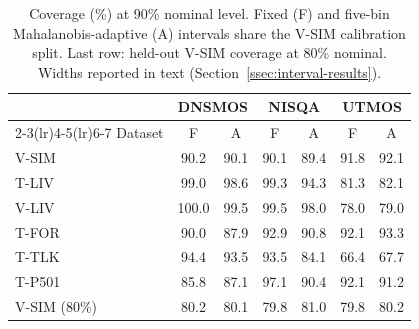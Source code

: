 \begin{table}[t]
  \centering
  \small
  \setlength{\tabcolsep}{4pt}
  \renewcommand{\arraystretch}{0.94}
  \caption{Coverage (\%) at 90\% nominal level. Fixed (F) and five-bin Mahalanobis-adaptive (A) intervals share the V-SIM calibration split. Last row: held-out V-SIM coverage at 80\% nominal. Widths reported in text (Section~\ref{ssec:interval-results}).}
  \vspace{2pt}
  \label{tab:coverage}
  \begin{tabular}{@{}lcccccc@{}}
    \toprule
    & \multicolumn{2}{c}{DNSMOS} & \multicolumn{2}{c}{NISQA} & \multicolumn{2}{c}{UTMOS} \\
    \cmidrule(lr){2-3}\cmidrule(lr){4-5}\cmidrule(lr){6-7}
    Dataset & F & A & F & A & F & A \\
    \midrule
    V-SIM  & 90.2  & 90.1 & 90.1 & 89.4 & 91.8 & 92.1 \\
    T-LIV  & 99.0  & 98.6 & 99.3 & 94.3 & 81.3 & 82.1 \\
    V-LIV  & 100.0 & 99.5 & 99.5 & 98.0 & 78.0 & 79.0 \\
    T-FOR  & 90.0  & 87.9 & 92.9 & 90.8 & 92.1 & 93.3 \\
    T-TLK  & 94.4  & 93.5 & 93.5 & 84.1 & 66.4 & 67.7 \\
    T-P501 & 85.8  & 87.1 & 97.1 & 90.4 & 92.1 & 91.2 \\
    \midrule
    V-SIM (80\%) & 80.2 & 80.1 & 79.8 & 81.0 & 79.8 & 80.2 \\
    \bottomrule
  \end{tabular}
\end{table}